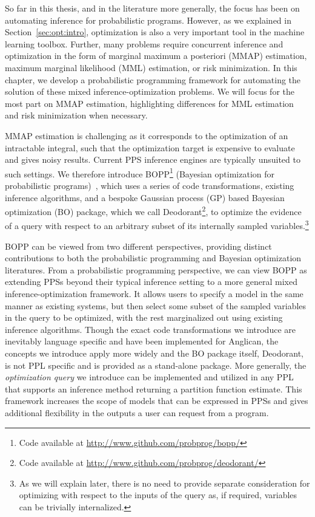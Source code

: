 
So far in this thesis, and in the literature more generally, the focus has been on automating
inference for probabilistic programs.  However, as we explained in Section~\ref{sec:opt:intro},
optimization is also a very important tool in the machine learning toolbox.  Further, many problems
require concurrent inference and optimization in the form of marginal maximum a posteriori (MMAP) estimation,
maximum marginal likelihood (MML) estimation, or risk minimization.  In this chapter, we develop a probabilistic programming framework
for automating the solution of these mixed inference-optimization problems.
We will focus for the most part on
MMAP estimation, highlighting differences for MML estimation and risk minimization when necessary.

MMAP estimation is challenging as it corresponds to the optimization of an intractable integral, such that the 
optimization target is expensive to evaluate and gives noisy results.  Current PPS inference engines are 
typically unsuited to such settings.  We therefore introduce BOPP\footnote{Code available at \url{http://www.github.com/probprog/bopp/}}
(Bayesian optimization for probabilistic programs)~\citep{rainforth2015workshopbopp,rainforth2016bayesian}, 
which uses a series of code transformations, existing inference algorithms,
and a bespoke Gaussian process (GP) based Bayesian optimization (BO) package, which we call Deodorant\footnote{Code available
at \url{http://www.github.com/probprog/deodorant/}}, to optimize the evidence of a query with respect to
an arbitrary subset of its internally sampled variables.\footnote{As we will explain later, there is no need to
	provide separate consideration for optimizing with respect to the inputs of the query as, if required,
	variables can be trivially internalized.}

BOPP can be viewed from two different perspectives, providing distinct contributions to both the probabilistic
programming and Bayesian optimization literatures.  From a probabilistic programming perspective, we can
view BOPP as extending PPSs beyond their typical inference setting to a more
general mixed inference-optimization framework.  It allows users to specify a model in the same manner 
as existing systems, but then select some subset of the sampled variables in the query to be optimized, 
with the rest marginalized out using existing inference algorithms.  Though the exact code transformations we
introduce are inevitably language specific and have been implemented for Anglican, the concepts we
introduce apply more widely and the BO package itself, Deodorant, is not PPL specific and is provided
as a stand-alone package.  More generally, the \textit{optimization query} we 
introduce can be implemented and utilized in any PPL that supports an inference method returning a 
partition function estimate.  This framework increases the scope of models that can be expressed in
PPSs and gives additional flexibility in the outputs a user can request from a program.

